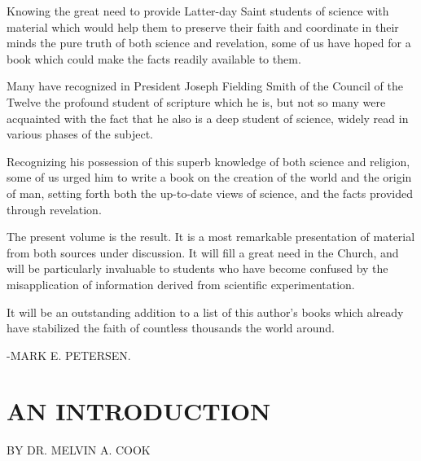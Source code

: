Knowing the great need to provide Latter-day Saint students of science with material which
would help them to preserve their faith and coordinate in their minds the pure truth of both
science and revelation, some of us have hoped for a book which could make the facts readily
available to them.

Many have recognized in President Joseph Fielding Smith of the Council of the Twelve the
profound student of scripture which he is, but not so many were acquainted with the fact that
he also is a deep student of science, widely read in various phases of the subject.

Recognizing his possession of this superb knowledge of both science and religion, some of
us urged him to write a book on the creation of the world and the origin of man, setting forth
both the up-to-date views of science, and the facts provided through revelation.

The present volume is the result. It is a most remarkable presentation of material from both
sources under discussion. It will fill a great need in the Church, and will be particularly
invaluable to students who have become confused by the misapplication of information
derived from scientific experimentation.

It will be an outstanding addition to a list of this author's books which already have stabilized
the faith of countless thousands the world around.

\vspace{\onelineskip}
-MARK E. PETERSEN.

\newpage
\section{AN INTRODUCTION}

\begin{flushleft}
BY DR. MELVIN A. COOK
\end{flushleft}

